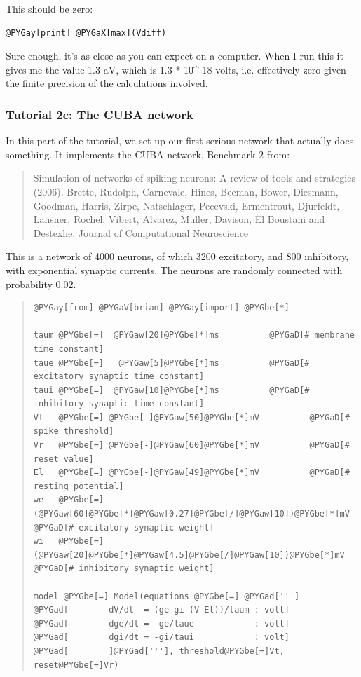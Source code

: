 \documentclass[letterpaper,10pt]{manual}
\begin{document}
This should be zero:

\begin{Verbatim}[commandchars=@\[\]]
@PYGay[print] @PYGaX[max](Vdiff)
\end{Verbatim}

Sure enough, it's as close as you can expect on a computer. When I run this
it gives me the value 1.3 aV, which is 1.3 * 10\textasciicircum{}-18 volts, i.e. effectively
zero given the finite precision of the calculations involved.

\resetcurrentobjects


\subsubsection{Tutorial 2c: The CUBA network}

In this part of the tutorial, we set up our first serious network
that actually does something. It implements the CUBA network, Benchmark 2 from:
\begin{quote}

Simulation of networks of spiking neurons: A review of tools and strategies (2006).
Brette, Rudolph, Carnevale, Hines, Beeman, Bower, Diesmann, Goodman, Harris, Zirpe,
Natschlager, Pecevski, Ermentrout, Djurfeldt, Lansner, Rochel, Vibert, Alvarez, Muller,
Davison, El Boustani and Destexhe.
Journal of Computational Neuroscience
\end{quote}

This is a network of 4000 neurons, of which 3200 excitatory, and 800 inhibitory, with
exponential synaptic currents. The neurons are randomly connected with probability 0.02.
\begin{quote}

\begin{Verbatim}[commandchars=@\[\]]
@PYGay[from] @PYGaV[brian] @PYGay[import] @PYGbe[*]

taum @PYGbe[=]  @PYGaw[20]@PYGbe[*]ms          @PYGaD[# membrane time constant]
taue @PYGbe[=]   @PYGaw[5]@PYGbe[*]ms          @PYGaD[# excitatory synaptic time constant]
taui @PYGbe[=]  @PYGaw[10]@PYGbe[*]ms          @PYGaD[# inhibitory synaptic time constant]
Vt   @PYGbe[=] @PYGbe[-]@PYGaw[50]@PYGbe[*]mV          @PYGaD[# spike threshold]
Vr   @PYGbe[=] @PYGbe[-]@PYGaw[60]@PYGbe[*]mV          @PYGaD[# reset value]
El   @PYGbe[=] @PYGbe[-]@PYGaw[49]@PYGbe[*]mV          @PYGaD[# resting potential]
we   @PYGbe[=] (@PYGaw[60]@PYGbe[*]@PYGaw[0.27]@PYGbe[/]@PYGaw[10])@PYGbe[*]mV @PYGaD[# excitatory synaptic weight]
wi   @PYGbe[=]  (@PYGaw[20]@PYGbe[*]@PYGaw[4.5]@PYGbe[/]@PYGaw[10])@PYGbe[*]mV @PYGaD[# inhibitory synaptic weight]

model @PYGbe[=] Model(equations @PYGbe[=] @PYGad[''']
@PYGad[        dV/dt  = (ge-gi-(V-El))/taum : volt]
@PYGad[        dge/dt = -ge/taue            : volt]
@PYGad[        dgi/dt = -gi/taui            : volt]
@PYGad[        ]@PYGad['''], threshold@PYGbe[=]Vt, reset@PYGbe[=]Vr)
\end{Verbatim}
\end{quote}
\end{document}
